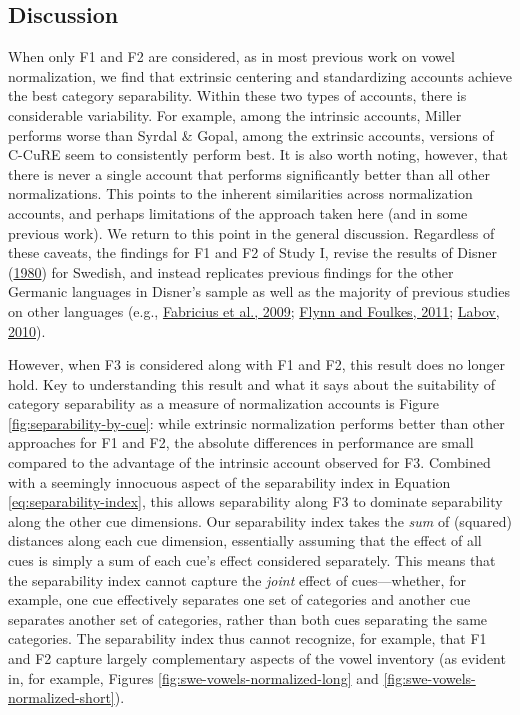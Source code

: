 \documentclass[utf8]{frontiersSCNS}
\begin{document}
\hypertarget{sec:studyI-discussion}{%
\subsection*{Discussion}\label{sec:studyI-discussion}}

When only F1 and F2 are considered, as in most previous work on vowel normalization, we find that extrinsic centering and standardizing accounts achieve the best category separability. Within these two types of accounts, there is considerable variability. For example, among the intrinsic accounts, Miller performs worse than Syrdal \& Gopal, among the extrinsic accounts, versions of C-CuRE seem to consistently perform best. It is also worth noting, however, that there is never a single account that performs significantly better than all other normalizations. This points to the inherent similarities across normalization accounts, and perhaps limitations of the approach taken here (and in some previous work). We return to this point in the general discussion. Regardless of these caveats, the findings for F1 and F2 of Study I, revise the results of Disner (\protect\hyperlink{ref-disner1980}{1980}) for Swedish, and instead replicates previous findings for the other Germanic languages in Disner's sample as well as the majority of previous studies on other languages (e.g., \protect\hyperlink{ref-fabricius2009}{Fabricius et al., 2009}; \protect\hyperlink{ref-Flynn2011}{Flynn and Foulkes, 2011}; \protect\hyperlink{ref-labov2010}{Labov, 2010}).

However, when F3 is considered along with F1 and F2, this result does no longer hold. Key to understanding this result and what it says about the suitability of category separability as a measure of normalization accounts is Figure \ref{fig:separability-by-cue}: while extrinsic normalization performs better than other approaches for F1 and F2, the absolute differences in performance are small compared to the advantage of the intrinsic account observed for F3. Combined with a seemingly innocuous aspect of the separability index in Equation \eqref{eq:separability-index}, this allows separability along F3 to dominate separability along the other cue dimensions. Our separability index takes the \emph{sum} of (squared) distances along each cue dimension, essentially assuming that the effect of all cues is simply a sum of each cue's effect considered separately. This means that the separability index cannot capture the \emph{joint} effect of cues---whether, for example, one cue effectively separates one set of categories and another cue separates another set of categories, rather than both cues separating the same categories. The separability index thus cannot recognize, for example, that F1 and F2 capture largely complementary aspects of the vowel inventory (as evident in, for example, Figures \ref{fig:swe-vowels-normalized-long} and \ref{fig:swe-vowels-normalized-short}).
\end{document}
